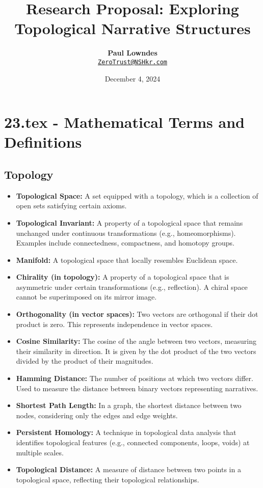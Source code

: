 \documentclass[12pt, a4paper]{article}
\title{\vspace{-2cm}\textbf{Research Proposal: Exploring Topological Narrative Structures}}
\author{\textbf{Paul Lowndes} \\ \href{mailto:ZeroTrust@NSHkr.com}{\texttt{ZeroTrust@NSHkr.com}}}
\date{\small December 4, 2024}
\begin{document}
\maketitle
\vspace{-1.5em} 
 
 
 
\section{23.tex - Mathematical Terms and Definitions}

\subsection{Topology}

\begin{itemize}
    \item \textbf{Topological Space:} A set equipped with a topology, which is a collection of open sets satisfying certain axioms.
    \item \textbf{Topological Invariant:} A property of a topological space that remains unchanged under continuous transformations (e.g., homeomorphisms). Examples include connectedness, compactness, and homotopy groups.
    \item \textbf{Manifold:} A topological space that locally resembles Euclidean space.
    \item \textbf{Chirality (in topology): } A property of a topological space that is asymmetric under certain transformations (e.g., reflection).  A chiral space cannot be superimposed on its mirror image.
    \item \textbf{Orthogonality (in vector spaces): } Two vectors are orthogonal if their dot product is zero. This represents independence in vector spaces.
    \item \textbf{Cosine Similarity:} The cosine of the angle between two vectors, measuring their similarity in direction. It is given by the dot product of the two vectors divided by the product of their magnitudes.
    \item \textbf{Hamming Distance:} The number of positions at which two vectors differ. Used to measure the distance between binary vectors representing narratives.
    \item \textbf{Shortest Path Length:} In a graph, the shortest distance between two nodes, considering only the edges and edge weights.
    \item \textbf{Persistent Homology:} A technique in topological data analysis that identifies topological features (e.g., connected components, loops, voids) at multiple scales.
    \item \textbf{Topological Distance:} A measure of distance between two points in a topological space, reflecting their topological relationships.
\end{itemize}
\end{document}
